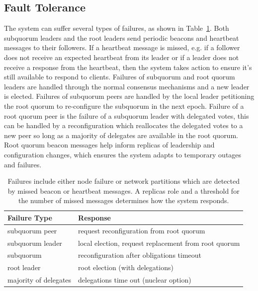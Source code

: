 \subsection{Fault Tolerance}
\label{ch03_fault_tolerance}

The system can suffer several types of failures, as shown in Table~\ref{tab:failure_categories}.
Both subquorum leaders and the root leaders send periodic beacons and heartbeat messages to their followers.
If a heartbeat message is missed, e.g. if a follower does not receive an expected heartbeat from its leader or if a leader does not receive a response from the heartbeat, then the system takes action to ensure it's still available to respond to clients.
Failures of subquorum and root quorum leaders are handled through the normal consensus mechanisms and a new leader is elected.
Failures of subquorum peers are handled by the local leader petitioning the root quorum to re-configure the subquorum in the next epoch.
Failure of a root quorum peer is the failure of a subquorum leader with delegated votes, this can be handled by a reconfiguration which reallocates the delegated votes to a new peer so long as a majority of delegates are available in the root quorum.
Root quorum beacon messages help inform replicas of leadership and configuration changes, which ensures the system adapts to temporary outages and failures.

\renewcommand{\baselinestretch}{1}
\small\normalsize
 \begin{table}[ht]
\caption[HC Failure Categories]{Failures include either node failure or network partitions which are detected by missed beacon or heartbeat messages. A replicas role and a threshold for the number of missed messages determines how the system responds.}
\begin{center}
\begin{tabular}{l|l}
\hline
Failure Type & Response \\
\hline \hline
subquorum peer & request reconfiguration from root quorum \\
subquorum leader & local election, request replacement from root quorum \\
subquorum & reconfiguration after obligations timeout \\
root leader & root election (with delegations)\\
majority of delegates & delegations time out (nuclear option) \\
\hline
\end{tabular}
\end{center}
\label{tab:failure_categories}
\end{table}
 \renewcommand{\baselinestretch}{2}
\small\normalsize

